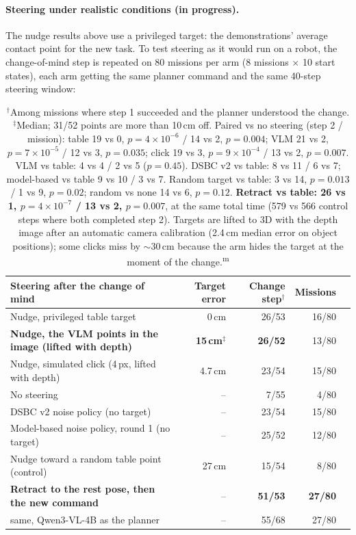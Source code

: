 \documentclass[10pt,a4paper]{article}
\DeclareRobustCommand{\meas}{\textsuperscript{\textcolor{green!50!black}{m}}}
\begin{document}
\paragraph{Steering under realistic conditions (in progress).} The nudge results above use a privileged target: the demonstrations' average contact point for the new task. To test steering as it would run on a robot, the change-of-mind step is repeated on 80 missions per arm (8 missions $\times$ 10 start states), each arm getting the same planner command and the same 40-step steering window:
\begin{table}[H]\centering\small
\begin{tabular}{p{6.0cm}rrrl}
\toprule
Steering after the change of mind & Target error & Change step$^\dagger$ & Missions & \\
\midrule
Nudge, privileged table target & 0\,cm & 26/53 & 16/80 & \\
\textbf{Nudge, the VLM points in the image (lifted with depth)} & \textbf{15\,cm}$^\ddagger$ & \textbf{26/52} & 13/80 & \\
Nudge, simulated click (4\,px, lifted with depth) & 4.7\,cm & 23/54 & 15/80 & \\
No steering & -- & 7/55 & 4/80 & \\
DSBC v2 noise policy (no target) & -- & 23/54 & 15/80 & \\
Model-based noise policy, round 1 (no target) & -- & 25/52 & 12/80 & \\
Nudge toward a random table point (control) & 27\,cm & 15/54 & 8/80 & \\
\textbf{Retract to the rest pose, then the new command} & -- & \textbf{51/53} & \textbf{27/80} & \\
\quad same, Qwen3-VL-4B as the planner & -- & 55/68 & 27/80 & \\
\bottomrule
\end{tabular}
\caption{$^\dagger$Among missions where step 1 succeeded and the planner understood the change. $^\ddagger$Median; 31/52 points are more than 10\,cm off. Paired vs no steering (step 2 / mission): table 19 vs 0, $p=4\times10^{-6}$ / 14 vs 2, $p=0.004$; VLM 21 vs 2, $p=7\times10^{-5}$ / 12 vs 3, $p=0.035$; click 19 vs 3, $p=9\times10^{-4}$ / 13 vs 2, $p=0.007$. VLM vs table: 4 vs 4 / 2 vs 5 ($p=0.45$). DSBC v2 vs table: 8 vs 11 / 6 vs 7; model-based vs table 9 vs 10 / 3 vs 7. Random target vs table: 3 vs 14, $p=0.013$ / 1 vs 9, $p=0.02$; random vs none 14 vs 6, $p=0.12$. \textbf{Retract vs table: 26 vs 1, $p=4\times10^{-7}$ / 13 vs 2, $p=0.007$}, at the same total time (579 vs 566 control steps where both completed step 2). Targets are lifted to 3D with the depth image after an automatic camera calibration (2.4\,cm median error on object positions); some clicks miss by $\sim$30\,cm because the arm hides the target at the moment of the change.\meas}
\end{table}
\end{document}
